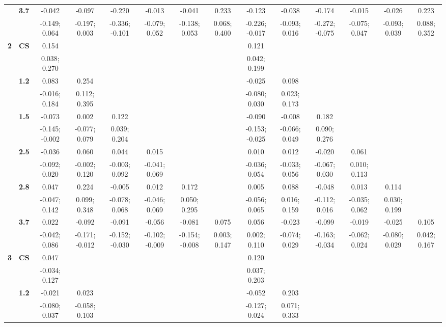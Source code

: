 \begin{landscape}
\begin{table}[!htp]
\begin{center}
\begin{tabular}{>{\bfseries}c>{\bfseries}ccccccccccccc}
 & 3.7 & -0.042 & -0.097 & -0.220 & -0.013 & -0.041 & 0.233 & -0.123 & -0.038 & -0.174 & -0.015 & -0.026 & 0.223\\
 &  & -0.149; 0.064 & -0.197; 0.003 & -0.336; -0.101 & -0.079; 0.052 & -0.138; 0.053 & 0.068; 0.400 & -0.226; -0.017 & -0.093; 0.016 & -0.272; -0.075 & -0.075; 0.047 & -0.093; 0.039 & 0.088; 0.352\\[0.7ex]
 \midrule
2 & CS & 0.154 &  &  &  &  &  & 0.121 &  &  &  &  & \\
 &  & 0.038; 0.270 &  &  &  &  &  & 0.042; 0.199 &  &  &  &  & \\[0.7ex]
 & 1.2 & 0.083 & 0.254 &  &  &  &  & -0.025 & 0.098 &  &  &  & \\
 &  & -0.016; 0.184 & 0.112; 0.395 &  &  &  &  & -0.080; 0.030 & 0.023; 0.173 &  &  &  & \\[0.7ex]
 & 1.5 & -0.073 & 0.002 & 0.122 &  &  &  & -0.090 & -0.008 & 0.182 &  &  & \\
 &  & -0.145; -0.002 & -0.077; 0.079 & 0.039; 0.204 &  &  &  & -0.153; -0.025 & -0.066; 0.049 & 0.090; 0.276 &  &  & \\[0.7ex]
 & 2.5 & -0.036 & 0.060 & 0.044 & 0.015 &  &  & 0.010 & 0.012 & -0.020 & 0.061 &  & \\
 &  & -0.092; 0.020 & -0.002; 0.120 & -0.003; 0.092 & -0.041; 0.069 &  &  & -0.036; 0.054 & -0.033; 0.056 & -0.067; 0.030 & 0.010; 0.113 &  & \\[0.7ex]
 & 2.8 & 0.047 & 0.224 & -0.005 & 0.012 & 0.172 &  & 0.005 & 0.088 & -0.048 & 0.013 & 0.114 & \\
 &  & -0.047; 0.142 & 0.099; 0.348 & -0.078; 0.068 & -0.046; 0.069 & 0.050; 0.295 &  & -0.056; 0.065 & 0.016; 0.159 & -0.112; 0.016 & -0.035; 0.062 & 0.030; 0.199 & \\[0.7ex]
 & 3.7 & 0.022 & -0.092 & -0.091 & -0.056 & -0.081 & 0.075 & 0.056 & -0.023 & -0.099 & -0.019 & -0.025 & 0.105\\
 &  & -0.042; 0.086 & -0.171; -0.012 & -0.152; -0.030 & -0.102; -0.009 & -0.154; -0.008 & 0.003; 0.147 & 0.002; 0.110 & -0.074; 0.029 & -0.163; -0.034 & -0.062; 0.024 & -0.080; 0.029 & 0.042; 0.167\\[0.7ex]
 \midrule
3 & CS & 0.047 &  &  &  &  &  & 0.120 &  &  &  &  & \\
 &  & -0.034; 0.127 &  &  &  &  &  & 0.037; 0.203 &  &  &  &  & \\[0.7ex]
 & 1.2 & -0.021 & 0.023 &  &  &  &  & -0.052 & 0.203 &  &  &  & \\
 &  & -0.080; 0.037 & -0.058; 0.103 &  &  &  &  & -0.127; 0.024 & 0.071; 0.333 &  &  &  & \\[0.7ex]

\end{tabular}
\end{center}
\end{table}
\end{landscape}
